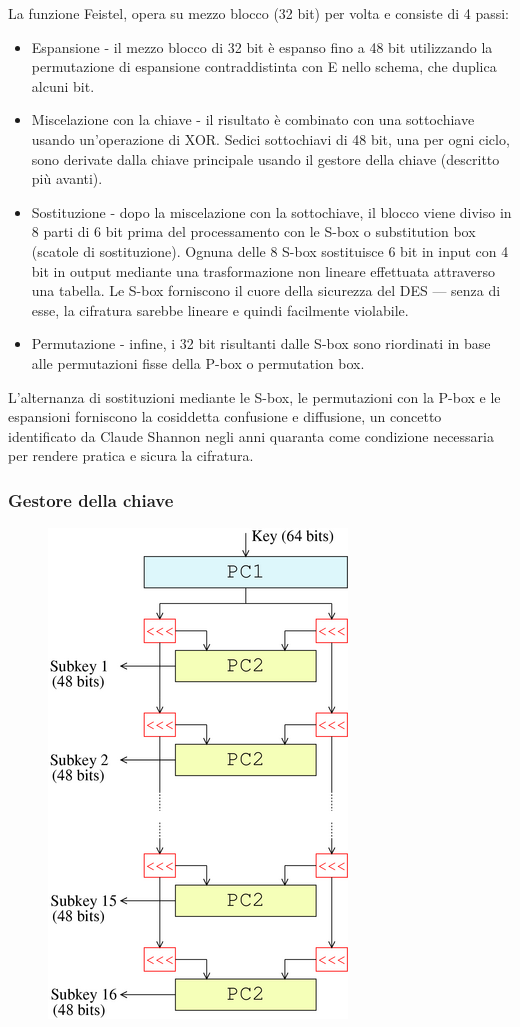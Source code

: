 \documentclass[10pt,a4paper]{article}
\begin{document}
La funzione Feistel, opera su mezzo blocco (32 bit) per volta e consiste di 4 passi:
\begin{itemize}
\item  Espansione - il mezzo blocco di 32 bit è espanso fino a 48 bit utilizzando la permutazione di espansione contraddistinta con E nello schema, che duplica alcuni bit.
\item Miscelazione con la chiave - il risultato è combinato con una sottochiave usando un'operazione di XOR. Sedici sottochiavi di 48 bit, una per ogni ciclo, sono derivate dalla chiave principale usando il gestore della chiave (descritto più avanti).
\item Sostituzione - dopo la miscelazione con la sottochiave, il blocco viene diviso in 8 parti di 6 bit prima del processamento con le S-box o substitution box (scatole di sostituzione). Ognuna delle 8 S-box sostituisce 6 bit in input con 4 bit in output mediante una trasformazione non lineare effettuata attraverso una tabella. Le S-box forniscono il cuore della sicurezza del DES — senza di esse, la cifratura sarebbe lineare e quindi facilmente violabile.
\item Permutazione - infine, i 32 bit risultanti dalle S-box sono riordinati in base alle permutazioni fisse della P-box o permutation box.  
\end{itemize}

L'alternanza di sostituzioni mediante le S-box, le permutazioni con la P-box e le espansioni forniscono la cosiddetta confusione e diffusione, un concetto identificato da Claude Shannon negli anni quaranta come condizione necessaria per rendere pratica e sicura la cifratura.

\subsubsection{Gestore della chiave}

\begin{figure}[htbp]
\includegraphics[scale=0.6]{immagini/DES_gestore_chiave.png}
\end{figure}
\end{document}
